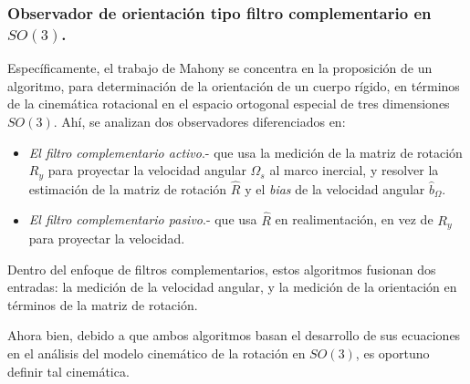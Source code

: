 \documentclass[10pt]{report}
\numberwithin{equation}{chapter}
\numberwithin{algorithm}{chapter}
\begin{document}
\subsubsection{Observador de orientación tipo filtro complementario en $SO(3)$.}
Específicamente, el trabajo de Mahony se concentra en la proposición de un algoritmo, para determinación de la orientación de un cuerpo rígido, en términos de la cinemática rotacional en el espacio ortogonal especial de tres dimensiones $SO(3)$. Ahí, se analizan dos observadores diferenciados en:
\begin{itemize}
\item \emph{El filtro complementario activo}.- que usa la medición de la matriz de rotación $R_y$ para proyectar la velocidad angular $\Omega_s$ al marco inercial, y resolver la estimación de la matriz de rotación $\hat{R}$ y el \emph{bias} de la velocidad angular $\hat{b}_\Omega$.
\item \emph{El filtro complementario pasivo}.- que usa $\hat{R}$ en realimentación, en vez de $R_y$ para proyectar la velocidad.
\end{itemize}
Dentro del enfoque de filtros complementarios, estos algoritmos fusionan dos entradas: la medición de la velocidad angular, y la medición de la orientación en términos de la matriz de rotación.\par
Ahora bien, debido a que ambos algoritmos basan el desarrollo de sus ecuaciones en el análisis del modelo cinemático de la rotación en $SO(3)$, es oportuno definir tal cinemática. 
\end{document}
